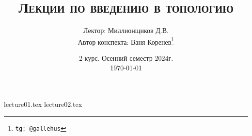 \documentclass[a4paper]{article}
\title{\scshape {Лекции по введению в топологию}}
\date{2 курс. Осенний семестр 2024г. \\ \today}
\author{Лектор: Миллионщиков Д.В. \\ Автор конспекта: Ваня Коренев\thanks{\texttt{tg: @gallehus}}}
\begin{document}
\maketitle
\newpage
\tableofcontents

\newpage

{lecture01.tex}
{lecture02.tex}
\end{document}
